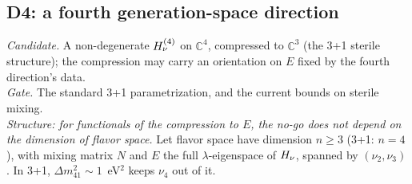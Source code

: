 \subsection{D4: a fourth generation-space direction}\label{sec:D4}
\emph{Candidate.} A non-degenerate $H_\nu^{(4)}$ on $\mathbb C^4$, compressed to $\mathbb C^3$
(the 3+1 sterile structure); the compression may carry an orientation on $E$ fixed by the
fourth direction's data.\\
\emph{Gate.} The standard 3+1 parametrization, and the current bounds on sterile mixing.\\
\emph{Structure: for functionals of the compression to $E$, the no-go does not depend on the
dimension of flavor space.} Let flavor space have dimension $n\ge3$ (3+1: $n=4$), with mixing matrix
$N$ and $E$ the full $\lambda$-eigenspace of $H_\nu$, spanned by $(\nu_2,\nu_3)$. In 3+1,
$\Delta m^2_{41}\sim1$~eV$^2$ keeps $\nu_4$ out of it.
